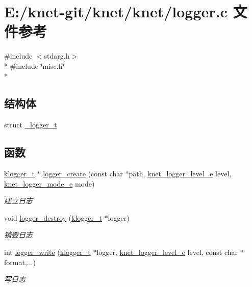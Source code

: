 \hypertarget{a00067}{}\section{E\+:/knet-\/git/knet/knet/logger.c 文件参考}
\label{a00067}
{\ttfamily \#include $<$stdarg.\+h$>$}\\*
{\ttfamily \#include \char`\"{}misc.\+h\char`\"{}}\\*
\subsection*{结构体}
\begin{DoxyCompactItemize}
\item 
struct \hyperlink{a00027}{\+\_\+logger\+\_\+t}
\end{DoxyCompactItemize}
\subsection*{函数}
\begin{DoxyCompactItemize}
\item 
\hyperlink{a00051_a1926fbbc891c0da81a8e683ac83deb05_a1926fbbc891c0da81a8e683ac83deb05}{klogger\+\_\+t} $\ast$ \hyperlink{a00067_aedcf4b2fca57e3e8e3886c1acea38afd_aedcf4b2fca57e3e8e3886c1acea38afd}{logger\+\_\+create} (const char $\ast$path, \hyperlink{a00051_a8bb61ec2ff976625d0707a81c1ccc149_a8bb61ec2ff976625d0707a81c1ccc149}{knet\+\_\+logger\+\_\+level\+\_\+e} level, \hyperlink{a00051_a3ad8e017e53143bca2ada78d2bfa30e1_a3ad8e017e53143bca2ada78d2bfa30e1}{knet\+\_\+logger\+\_\+mode\+\_\+e} mode)
\begin{DoxyCompactList}\small\item\em 建立日志 \end{DoxyCompactList}\item 
void \hyperlink{a00067_a4a445d874f7523df4fa17b909c47035c_a4a445d874f7523df4fa17b909c47035c}{logger\+\_\+destroy} (\hyperlink{a00051_a1926fbbc891c0da81a8e683ac83deb05_a1926fbbc891c0da81a8e683ac83deb05}{klogger\+\_\+t} $\ast$logger)
\begin{DoxyCompactList}\small\item\em 销毁日志 \end{DoxyCompactList}\item 
int \hyperlink{a00067_a725a2f5b84d2ee158e022d6972f3f327_a725a2f5b84d2ee158e022d6972f3f327}{logger\+\_\+write} (\hyperlink{a00051_a1926fbbc891c0da81a8e683ac83deb05_a1926fbbc891c0da81a8e683ac83deb05}{klogger\+\_\+t} $\ast$logger, \hyperlink{a00051_a8bb61ec2ff976625d0707a81c1ccc149_a8bb61ec2ff976625d0707a81c1ccc149}{knet\+\_\+logger\+\_\+level\+\_\+e} level, const char $\ast$format,...)
\begin{DoxyCompactList}\small\item\em 写日志 \end{DoxyCompactList}\end{DoxyCompactItemize}
